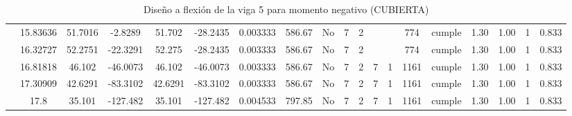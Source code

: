 \begin{table}[H]
{\begin{tabular}{|c|c|c|c|c|c|r|c|c|c|c|c|c|c|c|c|c|c|c|}
\cline{2-19}    & 15.83636 & 51.7016 & -2.8289 & 51.702 & -28.2435 & 0.003333 & 586.67 & No  & 7   & 2   &     &     & 774 & \cellcolor[rgb]{ .776,  .937,  .808}cumple & 1.30 & 1.00 & 1   & 0.833 \bigstrut\\
\cline{2-19}    & 16.32727 & 52.2751 & -22.3291 & 52.275 & -28.2435 & 0.003333 & 586.67 & No  & 7   & 2   &     &     & 774 & \cellcolor[rgb]{ .776,  .937,  .808}cumple & 1.30 & 1.00 & 1   & 0.833 \bigstrut\\
\cline{2-19}    & 16.81818 & 46.102 & -46.0073 & 46.102 & -46.0073 & 0.003333 & 586.67 & No  & 7   & 2   & 7   & 1   & 1161 & \cellcolor[rgb]{ .776,  .937,  .808}cumple & 1.30 & 1.00 & 1   & 0.833 \bigstrut\\
\cline{2-19}    & 17.30909 & 42.6291 & -83.3102 & 42.6291 & -83.3102 & 0.003333 & 586.67 & No  & 7   & 2   & 7   & 1   & 1161 & \cellcolor[rgb]{ .776,  .937,  .808}cumple & 1.30 & 1.00 & 1   & 0.833 \bigstrut\\
\cline{2-19}    & 17.8 & 35.101 & -127.482 & 35.101 & -127.482 & 0.004533 & 797.85 & No  & 7   & 2   & 7   & 1   & 1161 & \cellcolor[rgb]{ .776,  .937,  .808}cumple & 1.30 & 1.00 & 1   & 0.833 \bigstrut\\
\hline
\end{tabular}%
 
  }
      \caption{Diseño a flexión de la viga 5 para momento negativo (CUBIERTA) }
  \label{tab:F VG5 CUB M-}%
\end{table}%
